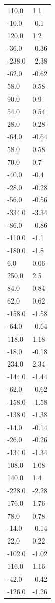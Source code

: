 \begin{longtable}{ll}
110.0 & 1.1 \\
-10.0 & -0.1 \\
120.0 & 1.2 \\
-36.0 & -0.36 \\
-238.0 & -2.38 \\
-62.0 & -0.62 \\
58.0 & 0.58 \\
90.0 & 0.9 \\
54.0 & 0.54 \\
28.0 & 0.28 \\
-64.0 & -0.64 \\
58.0 & 0.58 \\
70.0 & 0.7 \\
-40.0 & -0.4 \\
-28.0 & -0.28 \\
-56.0 & -0.56 \\
-334.0 & -3.34 \\
-86.0 & -0.86 \\
-110.0 & -1.1 \\
-180.0 & -1.8 \\
6.0 & 0.06 \\
250.0 & 2.5 \\
84.0 & 0.84 \\
62.0 & 0.62 \\
-158.0 & -1.58 \\
-64.0 & -0.64 \\
118.0 & 1.18 \\
-18.0 & -0.18 \\
234.0 & 2.34 \\
-144.0 & -1.44 \\
-62.0 & -0.62 \\
-158.0 & -1.58 \\
-138.0 & -1.38 \\
-14.0 & -0.14 \\
-26.0 & -0.26 \\
-134.0 & -1.34 \\
108.0 & 1.08 \\
140.0 & 1.4 \\
-228.0 & -2.28 \\
176.0 & 1.76 \\
78.0 & 0.78 \\
-14.0 & -0.14 \\
22.0 & 0.22 \\
-102.0 & -1.02 \\
116.0 & 1.16 \\
-42.0 & -0.42 \\
-126.0 & -1.26 \\

\end{longtable}
